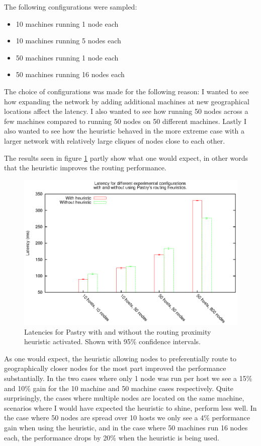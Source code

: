 The following configurations were sampled:
\begin{itemize}
\item 10 machines running 1 node each
\item 10 machines running 5 nodes each
\item 50 machines running 1 node each
\item 50 machines running 16 nodes each
\end{itemize}

The choice of configurations was made for the following reason:
I wanted to see how expanding the network by adding additional machines at new geographical locations affect the latency.
I also wanted to see how running 50 nodes across a few machines compared to running 50 nodes on 50 different machines. Lastly I also wanted to see how the heuristic behaved in the more extreme case with a larger network with relatively large cliques of nodes close to each other.

The results seen in figure \ref{figPastryHeuristic} partly show what one would expect, in other words that the heuristic improves the routing performance.

\begin{figure}[!htb]
  \begin{center}
    \includegraphics[width=0.9\linewidth]{illustrations/pastry_heuristic.eps}
    \caption{Latencies for Pastry with and without the routing proximity heuristic activated. Shown with 95\% confidence intervals.}
    \label{figPastryHeuristic}
  \end{center}
\end{figure}

As one would expect, the heuristic allowing nodes to preferentially route to geographically closer nodes for the most part improved the performance substantially. In the two cases where only 1 node was run per host we see a 15\% and 10\% gain for the 10 machine and 50 machine cases respectively.
Quite surprisingly, the cases where multiple nodes are located on the same machine, scenarios where I would have expected the heuristic to shine, perform less well. In the case where 50 nodes are spread over 10 hosts we only see a 4\% performance gain when using the heuristic, and in the case where 50 machines run 16 nodes each, the performance drops by 20\% when the heuristic is being used.

